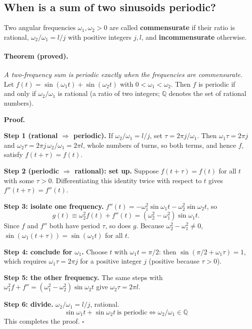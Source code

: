 \subsection{When is a sum of two sinusoids periodic?}

Two angular frequencies $\omega_1,\omega_2>0$ are called \textbf{commensurate} if their ratio is rational, $\omega_2/\omega_1=l/j$ with positive integers $j,l$, and \textbf{incommensurate} otherwise.

\paragraph{Theorem (proved).} \emph{A two-frequency sum is periodic exactly when the frequencies are commensurate.} Let $f(t)=\sin(\omega_1t)+\sin(\omega_2t)$ with $0<\omega_1<\omega_2$. Then $f$ is periodic if and only if $\omega_2/\omega_1$ is rational (a ratio of two integers; $\mathbb{Q}$ denotes the set of rational numbers).

\textbf{Proof.}

\textbf{Step 1 (rational $\Rightarrow$ periodic).} If $\omega_2/\omega_1=l/j$, set $\tau=2\pi j/\omega_1$. Then $\omega_1\tau=2\pi j$ and $\omega_2\tau=2\pi j\,\omega_2/\omega_1=2\pi l$, whole numbers of turns, so both terms, and hence $f$, satisfy $f(t+\tau)=f(t)$.

\textbf{Step 2 (periodic $\Rightarrow$ rational): set up.} Suppose $f(t+\tau)=f(t)$ for all $t$ with some $\tau>0$. Differentiating this identity twice with respect to $t$ gives $f''(t+\tau)=f''(t)$.

\textbf{Step 3: isolate one frequency.} $f''(t)=-\omega_1^2\sin\omega_1t-\omega_2^2\sin\omega_2t$, so
\[
g(t)\equiv\omega_2^2f(t)+f''(t)=(\omega_2^2-\omega_1^2)\sin\omega_1t .
\]
Since $f$ and $f''$ both have period $\tau$, so does $g$. Because $\omega_2^2-\omega_1^2\neq0$, $\sin(\omega_1(t+\tau))=\sin(\omega_1t)$ for all $t$.

\textbf{Step 4: conclude for $\omega_1$.} Choose $t$ with $\omega_1t=\pi/2$: then $\sin(\pi/2+\omega_1\tau)=1$, which requires $\omega_1\tau=2\pi j$ for a positive integer $j$ (positive because $\tau>0$).

\textbf{Step 5: the other frequency.} The same steps with $\omega_1^2f+f''=(\omega_1^2-\omega_2^2)\sin\omega_2t$ give $\omega_2\tau=2\pi l$.

\textbf{Step 6: divide.} $\omega_2/\omega_1=l/j$, rational.
\[
\boxed{\sin\omega_1t+\sin\omega_2t\ \text{is periodic}\iff\omega_2/\omega_1\in\mathbb{Q}}
\]
This completes the proof. $\square$

